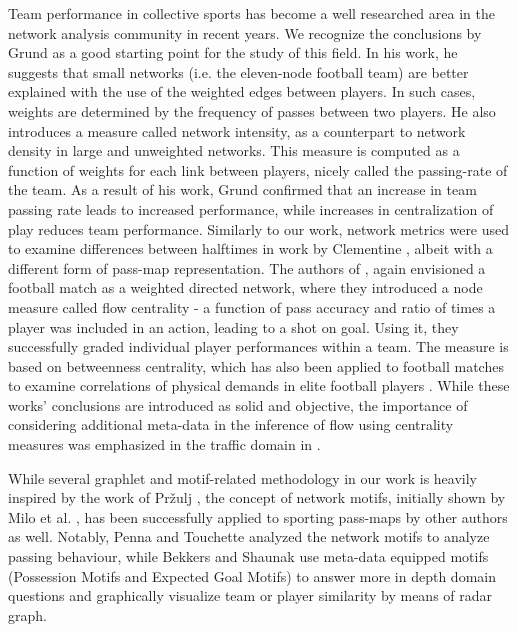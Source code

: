 \documentclass[9pt,twocolumn,twoside]{pnas-report}
\begin{document}
Team performance in collective sports has become a well researched area in the network analysis community in recent years. We recognize the conclusions by Grund \cite{grund} as a good starting point for the study of this field. In his work, he suggests that small networks (i.e. the eleven-node football team) are better explained with the use of the weighted edges between players. In such cases, weights are determined by the frequency of passes between two players. He also introduces a measure called network intensity, as a counterpart to network density in large and unweighted networks. This measure is computed as a function of weights for each link between players, nicely called the passing-rate of the team. As a result of his work, Grund confirmed that an increase in team passing rate leads to increased performance, while increases in centralization of play reduces team performance. Similarly to our work, network metrics were used to examine differences between halftimes in work by Clementine \cite{Clementine}, albeit with a different form of pass-map representation.  The authors of \cite{duch2010quantifying}, again envisioned a football match as a weighted directed network, where they introduced a node measure called flow centrality - a function of pass accuracy and ratio of times a player was included in an action, leading to a shot on goal. Using it, they successfully graded individual player performances within a team. The measure is based on betweenness centrality, which has also been applied to football matches to examine correlations of physical demands in elite football players \cite{castellano2019network}. While these works' conclusions are introduced as solid and objective, the importance of considering additional meta-data in the inference of flow using centrality measures was emphasized in the traffic domain in \cite{kazerani2009can}.

While several graphlet and motif-related methodology in our work is heavily inspired by the work of Pržulj \cite{przulj}, the concept of network motifs, initially shown by Milo et al. \cite{Milo}, has been successfully applied to sporting pass-maps by other authors as well. Notably, Penna and Touchette \cite{penna} analyzed the network motifs to analyze passing behaviour, while Bekkers and Shaunak \cite{Bekkers} use meta-data equipped motifs (Possession Motifs and Expected Goal Motifs) to answer more in depth domain questions and graphically visualize team or player similarity by means of radar graph.
\end{document}
